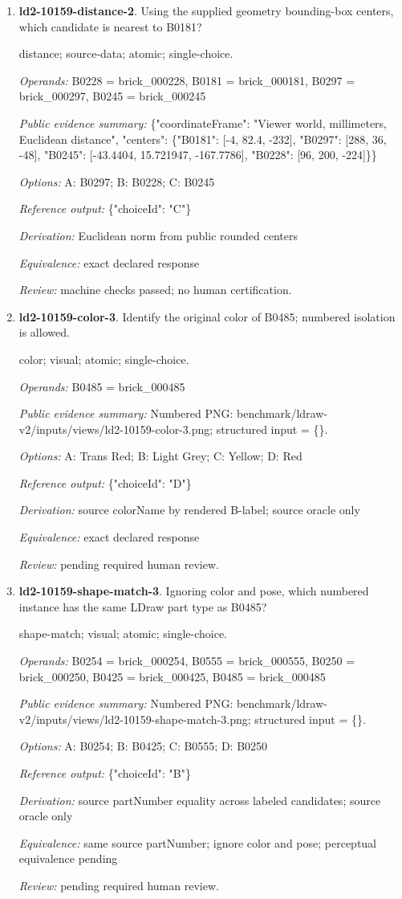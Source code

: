 \begin{enumerate}
\item \textbf{ld2-10159-distance-2}. Using the supplied geometry bounding-box centers, which candidate is nearest to B0181?
\par{\small distance; source-data; atomic; single-choice.\par\textit{Operands:} B0228 = brick\_000228, B0181 = brick\_000181, B0297 = brick\_000297, B0245 = brick\_000245\par\textit{Public evidence summary:} \{"coordinateFrame": "Viewer world, millimeters, Euclidean distance", "centers": \{"B0181": [-4, 82.4, -232], "B0297": [288, 36, -48], "B0245": [-43.4404, 15.721947, -167.7786], "B0228": [96, 200, -224]\}\}\par\textit{Options:} A: B0297; B: B0228; C: B0245\par\textit{Reference output:} \{"choiceId": "C"\}\par\textit{Derivation:} Euclidean norm from public rounded centers\par\textit{Equivalence:} exact declared response\par\textit{Review:} machine checks passed; no human certification.}
\item \textbf{ld2-10159-color-3}. Identify the original color of B0485; numbered isolation is allowed.
\par{\small color; visual; atomic; single-choice.\par\textit{Operands:} B0485 = brick\_000485\par\textit{Public evidence summary:} Numbered PNG: benchmark/ldraw-v2/inputs/views/ld2-10159-color-3.png; structured input = \{\}.\par\textit{Options:} A: Trans Red; B: Light Grey; C: Yellow; D: Red\par\textit{Reference output:} \{"choiceId": "D"\}\par\textit{Derivation:} source colorName by rendered B-label; source oracle only\par\textit{Equivalence:} exact declared response\par\textit{Review:} pending required human review.}
\item \textbf{ld2-10159-shape-match-3}. Ignoring color and pose, which numbered instance has the same LDraw part type as B0485?
\par{\small shape-match; visual; atomic; single-choice.\par\textit{Operands:} B0254 = brick\_000254, B0555 = brick\_000555, B0250 = brick\_000250, B0425 = brick\_000425, B0485 = brick\_000485\par\textit{Public evidence summary:} Numbered PNG: benchmark/ldraw-v2/inputs/views/ld2-10159-shape-match-3.png; structured input = \{\}.\par\textit{Options:} A: B0254; B: B0425; C: B0555; D: B0250\par\textit{Reference output:} \{"choiceId": "B"\}\par\textit{Derivation:} source partNumber equality across labeled candidates; source oracle only\par\textit{Equivalence:} same source partNumber; ignore color and pose; perceptual equivalence pending\par\textit{Review:} pending required human review.}

\end{enumerate}
